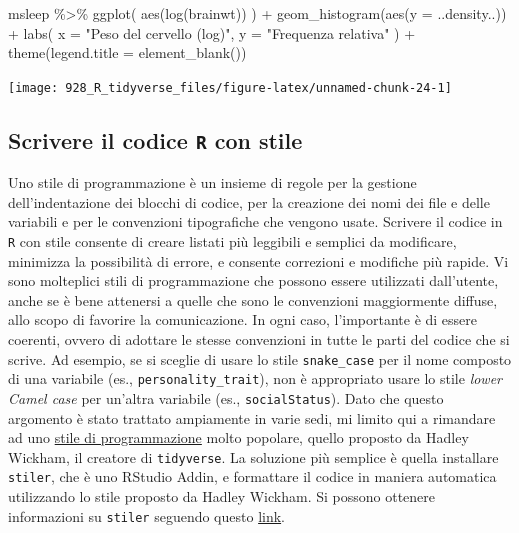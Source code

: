 \documentclass[
  10pt,
  italian,
  a4paper,
  extrafontsizes,onecolumn,openright
  ]{memoir}
\newenvironment{Shaded}{\begin{snugshade}}{\end{snugshade}}
\newcommand{\AttributeTok}[1]{\textcolor[rgb]{0.77,0.63,0.00}{#1}}
\newcommand{\FunctionTok}[1]{\textcolor[rgb]{0.00,0.00,0.00}{#1}}
\newcommand{\NormalTok}[1]{#1}
\newcommand{\SpecialCharTok}[1]{\textcolor[rgb]{0.00,0.00,0.00}{#1}}
\newcommand{\StringTok}[1]{\textcolor[rgb]{0.31,0.60,0.02}{#1}}
\begin{document}
\begin{Shaded}
\begin{Highlighting}[]
\NormalTok{msleep }\SpecialCharTok{\%\textgreater{}\%} 
  \FunctionTok{ggplot}\NormalTok{(}
    \FunctionTok{aes}\NormalTok{(}\FunctionTok{log}\NormalTok{(brainwt))}
\NormalTok{  ) }\SpecialCharTok{+}
  \FunctionTok{geom\_histogram}\NormalTok{(}\FunctionTok{aes}\NormalTok{(}\AttributeTok{y =}\NormalTok{ ..density..)) }\SpecialCharTok{+}
  \FunctionTok{labs}\NormalTok{(}
    \AttributeTok{x =} \StringTok{"Peso del cervello (log)"}\NormalTok{,}
    \AttributeTok{y =} \StringTok{"Frequenza relativa"}
\NormalTok{  ) }\SpecialCharTok{+}
  \FunctionTok{theme}\NormalTok{(}\AttributeTok{legend.title =} \FunctionTok{element\_blank}\NormalTok{())}
\end{Highlighting}
\end{Shaded}

\begin{center}\texttt{[image: 928\_R\_tidyverse\_files/figure-latex/unnamed-chunk-24-1]} \end{center}

\hypertarget{scrivere-il-codice-r-con-stile}{%
\subsection{\texorpdfstring{Scrivere il codice \texttt{R} con stile}{Scrivere il codice R con stile}}\label{scrivere-il-codice-r-con-stile}}

Uno stile di programmazione è un insieme di regole per la gestione dell'indentazione dei blocchi di codice, per la creazione dei nomi dei file e delle variabili e per le convenzioni tipografiche che vengono usate. Scrivere il codice in \texttt{R} con stile consente di creare listati più leggibili e semplici da modificare, minimizza la possibilità di errore, e consente correzioni e modifiche più rapide. Vi sono molteplici stili di programmazione che possono essere utilizzati dall'utente, anche se è bene attenersi a quelle che sono le convenzioni maggiormente diffuse, allo scopo di favorire la comunicazione. In ogni caso, l'importante è di essere coerenti, ovvero di adottare le stesse convenzioni in tutte le parti del codice che si scrive. Ad esempio, se si sceglie di usare lo stile \texttt{snake\_case} per il nome composto di una variabile (es., \texttt{personality\_trait}), non è appropriato usare lo stile \emph{lower Camel case} per un'altra variabile (es., \texttt{socialStatus}). Dato che questo argomento è stato trattato ampiamente in varie sedi, mi limito qui a rimandare ad uno \href{http://style.tidyverse.org/}{stile di programmazione} molto popolare, quello proposto da Hadley Wickham, il creatore di \texttt{tidyverse}. La soluzione più semplice è quella installare \texttt{stiler}, che è uno RStudio Addin, e formattare il codice in maniera automatica utilizzando lo stile proposto da Hadley Wickham. Si possono ottenere informazioni su \texttt{stiler} seguendo questo \href{https://github.com/r-lib/styler}{link}.
\end{document}
